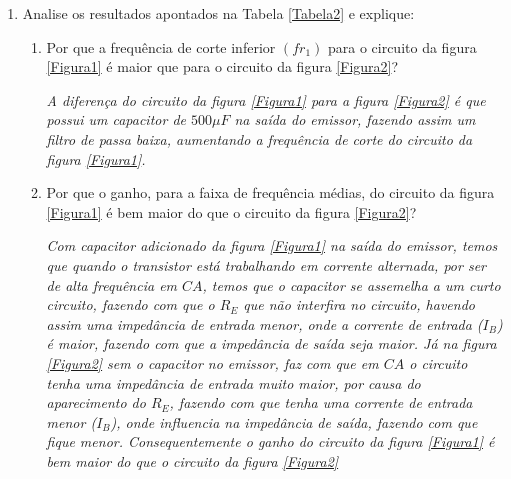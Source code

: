 \begin{enumerate}
	\item Analise os resultados apontados na Tabela \ref{Tabela2} e explique:
	\begin{enumerate}
		\item Por que a frequência de corte inferior $ (fr_1) $ para o circuito da figura \ref{Figura1} é maior que para o circuito da figura \ref{Figura2}?
		
		\textit{A diferença do circuito da figura \ref{Figura1} para a figura \ref{Figura2} é que possui um capacitor de $ 500 \mu F $ na saída do emissor, fazendo assim um filtro de passa baixa, aumentando a frequência de corte do circuito da figura \ref{Figura1}.}
		
		\item Por que o ganho, para a faixa de frequência médias, do circuito da figura \ref{Figura1} é bem maior do que o circuito da figura \ref{Figura2}?
		
		\textit{Com capacitor adicionado da figura \ref{Figura1} na saída do emissor, temos que quando o transistor está trabalhando em corrente alternada, por ser de alta frequência em $ CA $, temos que o capacitor se assemelha a um curto circuito, fazendo com que o $ R_E $ que não interfira no circuito, havendo assim uma impedância de entrada menor, onde a corrente de entrada ($ I_B $) é maior, fazendo com que a impedância de saída seja maior. Já na figura \ref{Figura2} sem o capacitor no emissor, faz com que em $ CA $ o circuito tenha uma impedância de entrada muito maior, por causa do aparecimento do $ R_E $, fazendo com que tenha uma corrente de entrada menor ($ I_B $), onde influencia na impedância de saída, fazendo com que fique menor. Consequentemente o ganho do circuito da figura \ref{Figura1} é bem maior do que o circuito da figura \ref{Figura2}}
		
	\end{enumerate}
\end{enumerate}



